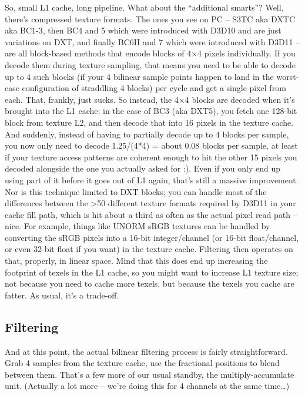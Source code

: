 \documentclass[12pt]{article}
\begin{document}
So, small L1 cache, long pipeline. What about the “additional smarts”? Well, there’s compressed texture formats. The ones you see on PC – S3TC aka DXTC aka BC1-3, then BC4 and 5 which were introduced with D3D10 and are just variations on DXT, and finally BC6H and 7 which were introduced with D3D11 – are all block-based methods that encode blocks of 4×4 pixels individually. If you decode them during texture sampling, that means you need to be able to decode up to 4 such blocks (if your 4 bilinear sample points happen to land in the worst-case configuration of straddling 4 blocks) per cycle and get a single pixel from each. That, frankly, just sucks. So instead, the 4×4 blocks are decoded when it’s brought into the L1 cache: in the case of BC3 (aka DXT5), you fetch one 128-bit block from texture L2, and then decode that into 16 pixels in the texture cache. And suddenly, instead of having to partially decode up to 4 blocks per sample, you now only need to decode 1.25/(4*4) = about 0.08 blocks per sample, at least if your texture access patterns are coherent enough to hit the other 15 pixels you decoded alongside the one you actually asked for :). Even if you only end up using part of it before it goes out of L1 again, that’s still a massive improvement. Nor is this technique limited to DXT blocks; you can handle most of the differences between the >50 different texture formats required by D3D11 in your cache fill path, which is hit about a third as often as the actual pixel read path – nice. For example, things like UNORM sRGB textures can be handled by converting the sRGB pixels into a 16-bit integer/channel (or 16-bit float/channel, or even 32-bit float if you want) in the texture cache. Filtering then operates on that, properly, in linear space. Mind that this does end up increasing the footprint of texels in the L1 cache, so you might want to increase L1 texture size; not because you need to cache more texels, but because the texels you cache are fatter. As usual, it’s a trade-off.

\subsection{Filtering}
\label{sec:orgc91e8a1}

And at this point, the actual bilinear filtering process is fairly straightforward. Grab 4 samples from the texture cache, use the fractional positions to blend between them. That’s a few more of our usual standby, the multiply-accumulate unit. (Actually a lot more – we’re doing this for 4 channels at the same time…)
\end{document}
